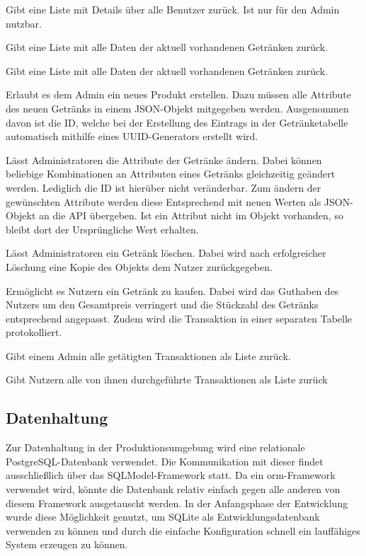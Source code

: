 \documentclass[conference,a4paper]{cs-techrep}
\begin{document}
\begin{description}[style=standard]
	\item[GET /users] Gibt eine Liste mit Details über alle Benutzer zurück.
	Ist nur für den Admin nutzbar.
	\item[GET /drinks] Gibt eine Liste mit alle Daten der aktuell vorhandenen Getränken zurück.
	\item[GET /drinks/\{drink\_id\}] Gibt eine Liste mit alle Daten der aktuell vorhandenen Getränken zurück.
	\item[POST /drinks] Erlaubt es dem Admin ein neues Produkt erstellen. Dazu müssen alle Attribute des neuen Getränks in einem JSON-Objekt mitgegeben werden. Ausgenommen davon ist die ID, welche bei der Erstellung des Eintrags in der Getränketabelle automatisch mithilfe eines UUID-Generators erstellt wird.
	\item[PUT /drinks/\{drink\_id\}]Lässt Administratoren die Attribute der Getränke ändern. Dabei können beliebige Kombinationen an Attributen eines Getränks gleichzeitig geändert werden. Lediglich die ID ist hierüber nicht veränderbar. Zum ändern der gewünschten Attribute werden diese Entsprechend mit neuen Werten als JSON-Objekt an die API übergeben. Ist ein Attribut nicht im Objekt vorhanden, so bleibt dort der Ursprüngliche Wert erhalten.
	\item[DELETE /drinks/\{drink\_id\}] Lässt Administratoren ein Getränk löschen. Dabei wird nach erfolgreicher Löschung eine Kopie des Objekts dem Nutzer zurückgegeben.
	\item[POST /transactions] Ermöglicht es Nutzern ein Getränk zu kaufen. Dabei wird das Guthaben des Nutzers um den Gesamtpreis verringert und die Stückzahl des Getränks entsprechend angepasst. Zudem wird die Transaktion in einer separaten Tabelle protokolliert.
	\item[GET /transactions] Gibt einem Admin alle getätigten Transaktionen als Liste zurück.
	\item[GET /transactions/me] Gibt Nutzern alle von ihnen durchgeführte Transaktionen als Liste zurück
\end{description}

\subsection{Datenhaltung} %
Zur Datenhaltung in der Produktionsumgebung wird eine relationale PostgreSQL-Datenbank verwendet. 
Die Kommunikation mit dieser findet ausschließlich über das SQLModel-Framework statt. 
Da ein \ac{orm}-Framework verwendet wird, könnte die Datenbank relativ einfach gegen alle anderen von diesem Framework ausgetauscht werden. 
In der Anfangsphase der Entwicklung wurde diese Möglichkeit genutzt, um SQLite \cite{sqlite} als Entwicklungsdatenbank verwenden zu können und durch die einfache Konfiguration schnell ein lauffähiges System erzeugen zu können.
\end{document}
